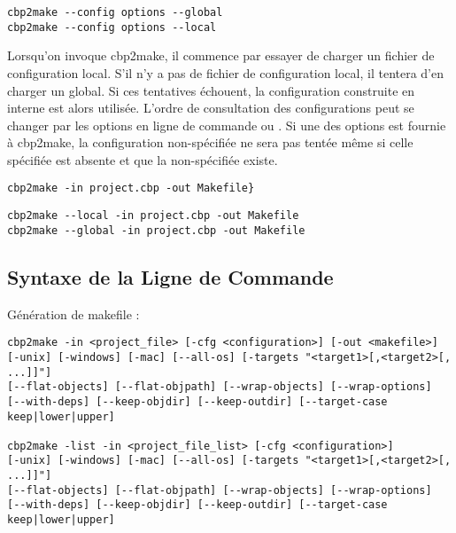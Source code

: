 
\begin{lstlisting}
cbp2make --config options --global
cbp2make --config options --local
\end{lstlisting}


Lorsqu'on invoque cbp2make, il commence par essayer de charger un fichier de configuration local. S'il n'y a pas de fichier de configuration local, il tentera d'en charger un global. Si ces tentatives échouent, la configuration construite en interne est alors utilisée. L'ordre de consultation des configurations peut se changer par les options en ligne de commande  ou . Si une des options est fournie à cbp2make, la configuration non-spécifiée ne sera pas tentée même si celle spécifiée est absente et que la non-spécifiée existe.


\begin{lstlisting}
cbp2make -in project.cbp -out Makefile}
\end{lstlisting}


\begin{lstlisting}
cbp2make --local -in project.cbp -out Makefile
cbp2make --global -in project.cbp -out Makefile
\end{lstlisting}

\subsection{Syntaxe de la Ligne de Commande}

Génération de makefile :
\begin{verbatim}
cbp2make -in <project_file> [-cfg <configuration>] [-out <makefile>]
[-unix] [-windows] [-mac] [--all-os] [-targets "<target1>[,<target2>[, ...]]"]
[--flat-objects] [--flat-objpath] [--wrap-objects] [--wrap-options]
[--with-deps] [--keep-objdir] [--keep-outdir] [--target-case keep|lower|upper]

cbp2make -list -in <project_file_list> [-cfg <configuration>]
[-unix] [-windows] [-mac] [--all-os] [-targets "<target1>[,<target2>[, ...]]"]
[--flat-objects] [--flat-objpath] [--wrap-objects] [--wrap-options]
[--with-deps] [--keep-objdir] [--keep-outdir] [--target-case keep|lower|upper]
\end{verbatim}

